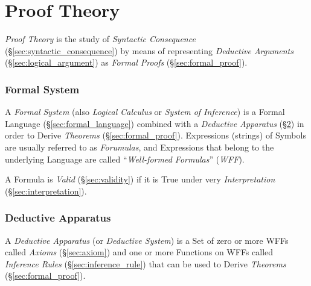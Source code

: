 \part{Proof Theory}\label{sec:proof_theory}

\emph{Proof Theory} is the study of \emph{Syntactic Consequence}
(\S\ref{sec:syntactic_consequence}) by means of representing
\emph{Deductive Arguments} (\S\ref{sec:logical_argument}) as
\emph{Formal Proofs} (\S\ref{sec:formal_proof}).



\section{Formal System}\label{sec:formal_system}

A \emph{Formal System} (also \emph{Logical Calculus} or \emph{System
  of Inference}) is a Formal Language (\S\ref{sec:formal_language})
combined with a \emph{Deductive Apparatus}
(\S\ref{sec:deductive_apparatus}) in order to Derive \emph{Theorems}
(\S\ref{sec:formal_proof}). Expressions (strings) of Symbols are
usually referred to as \emph{Forumulas}, and Expressions that belong
to the underlying Language are called ``\emph{Well-formed Formulas}''
(\emph{WFF}).

A Formula is \emph{Valid} (\S\ref{sec:validity}) if it is True under
very \emph{Interpretation} (\S\ref{sec:interpretation}).



\section{Deductive Apparatus} \label{sec:deductive_apparatus}

A \emph{Deductive Apparatus} (or \emph{Deductive System}) is a Set of
zero or more WFFs called \emph{Axioms} (\S\ref{sec:axiom}) and one or
more Functions on WFFs called \emph{Inference Rules}
(\S\ref{sec:inference_rule}) that can be used to Derive
\emph{Theorems} (\S\ref{sec:formal_proof}).

